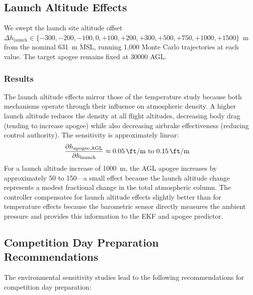 \documentclass[11pt,letterpaper]{article}
\begin{document}
\subsection{Launch Altitude Effects}
\label{sec:altitude}

We swept the launch site altitude offset $\Delta h_{\text{launch}} \in \{-300, -200, -100, 0, +100, +200, +300, +500, +750, +1000, +1500\}$~m from the nominal \SI{631}{\metre} MSL, running 1{,}000 Monte Carlo trajectories at each value. The target apogee remains fixed at \SI{30000}{\ft} AGL.

\subsubsection{Results}

The launch altitude effects mirror those of the temperature study because both mechanisms operate through their influence on atmospheric density. A higher launch altitude reduces the density at all flight altitudes, decreasing body drag (tending to increase apogee) while also decreasing airbrake effectiveness (reducing control authority). The sensitivity is approximately linear:
\begin{equation}
    \frac{\partial h_{\text{apogee,AGL}}}{\partial h_{\text{launch}}} \approx \SI{0.05}{\ft\per\metre} \text{ to } \SI{0.15}{\ft\per\metre}
    \label{eq:altitude_sensitivity}
\end{equation}
For a launch altitude increase of \SI{1000}{\metre}, the AGL apogee increases by approximately \SI{50}{\ft} to \SI{150}{\ft}---a small effect because the launch altitude change represents a modest fractional change in the total atmospheric column. The controller compensates for launch altitude effects slightly better than for temperature effects because the barometric sensor directly measures the ambient pressure and provides this information to the EKF and apogee predictor.

\subsection{Competition Day Preparation Recommendations}
\label{sec:competition_prep}

The environmental sensitivity studies lead to the following recommendations for competition day preparation:
\end{document}
